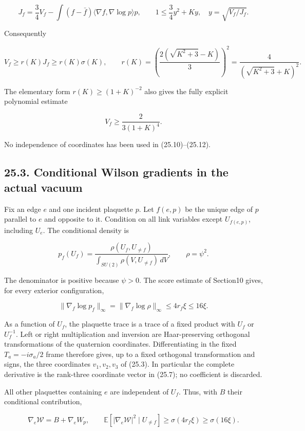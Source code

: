 \documentclass[
]{article}
\begin{document}
\[
 J_f=\frac34V_f-
 \int(f-\bar f)\langle\nabla f,\nabla\log p\rangle p,
 \qquad
 1\le\frac34y^2+Ky,
 \quad y=\sqrt{V_f/J_f}.
 \tag{25.10}
\]

Consequently

\[
 V_f\ge r(K)J_f\ge r(K)\sigma(K),
 \qquad
 r(K)=\left(\frac{2(\sqrt{K^2+3}-K)}3\right)^2
 =\frac4{(\sqrt{K^2+3}+K)^2}.
 \tag{25.11}
\]

The elementary form \(r(K)\ge(1+K)^{-2}\) also gives the fully explicit
polynomial estimate

\[
 V_f\ge\frac2{3(1+K)^4}.
 \tag{25.12}
\]

No independence of coordinates has been used in (25.10)--(25.12).

\subsection{25.3. Conditional Wilson gradients in the actual
vacuum}\label{conditional-wilson-gradients-in-the-actual-vacuum}

Fix an edge \(e\) and one incident plaquette \(p\). Let \(f(e,p)\) be
the unique edge of \(p\) parallel to \(e\) and opposite to it. Condition
on all link variables except \(U_{f(e,p)}\), including \(U_e\). The
conditional density is

\[
 p_f(U_f)=\frac{\rho(U_f,U_{\ne f})}
 {\int_{SU(2)}\rho(V,U_{\ne f})\,dV},
 \qquad \rho=\psi^2.
 \tag{25.13}
\]

The denominator is positive because \(\psi>0\). The score estimate of
Section10 gives, for every exterior configuration,

\[
 \|\nabla_{f}\log p_f\|_\infty
 =\|\nabla_f\log\rho\|_\infty
 \le4r_f\xi\le16\xi.
 \tag{25.14}
\]

As a function of \(U_f\), the plaquette trace is a trace of a fixed
product with \(U_f\) or \(U_f^{-1}\). Left or right multiplication and
inversion are Haar-preserving orthogonal transformations of the
quaternion coordinates. Differentiating in the fixed
\(T_a=-i\sigma_a/2\) frame therefore gives, up to a fixed orthogonal
transformation and signs, the three coordinates \(v_1,v_2,v_3\) of
(25.3). In particular the complete derivative is the rank-three
coordinate vector in (25.7); no coefficient is discarded.

All other plaquettes containing \(e\) are independent of \(U_f\). Thus,
with \(B\) their conditional contribution,

\[
 \nabla_e\mathcal W=B+\nabla_eW_p,
 \qquad
 \mathbb E\left[|\nabla_e\mathcal W|^2\mid U_{\ne f}\right]
 \ge\sigma(4r_f\xi)\ge\sigma(16\xi).
 \tag{25.15}
\]
\end{document}
